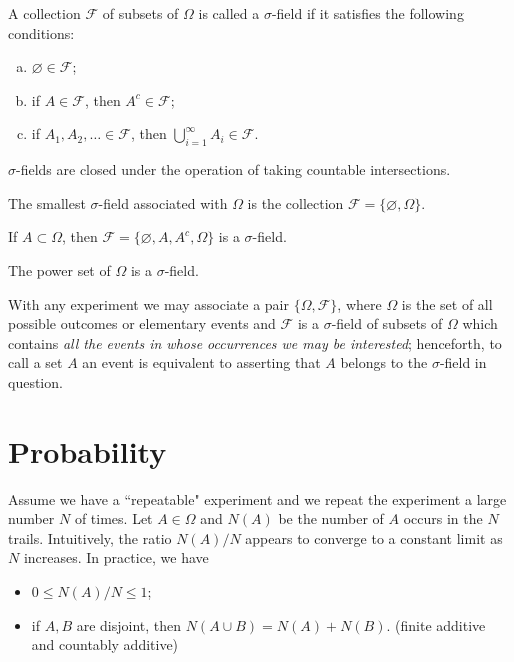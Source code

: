 \begin{definition}
A collection $\mathcal{F}$ of subsets of $\Omega$ is called a $\sigma$-field if it satisfies the following conditions: 
\begin{enumerate}[(a)]
    \item $\varnothing \in \mathcal{F}$;
    \item if $A \in \mathcal{F}$, then $A^c \in \mathcal{F}$;
    \item if $A_1, A_2, \dots \in \mathcal{F}$, then $\bigcup_{i=1}^\infty A_i \in \mathcal{F}$.
\end{enumerate}
\end{definition}

\begin{remark}
$\sigma$-fields are closed under the operation of taking countable intersections.
\end{remark}

\begin{example}
The smallest $\sigma$-field associated with $\Omega$ is the collection $\mathcal{F} = \{\varnothing, \Omega \}$.
\end{example}

\begin{example}
If $A \subset \Omega$, then $\mathcal{F} = \{\varnothing, A, A^c, \Omega \}$ is a $\sigma$-field. 
\end{example}

\begin{example}
The power set of $\Omega$ is a $\sigma$-field.
\end{example}

With any experiment we may associate a pair $\{\Omega, \mathcal{F}\}$, where $\Omega$ is the set of all possible outcomes or elementary events and $\mathcal{F}$ is a $\sigma$-field of subsets of $\Omega$ which contains \emph{all the events in whose occurrences we may be interested}; henceforth, to call a set $A$ an event is equivalent to asserting that $A$ belongs to the $\sigma$-field in question. 


\section{Probability}
Assume we have a ``repeatable" experiment and we repeat the experiment a large number $N$ of times. Let $A \in \Omega$ and $N(A)$ be the number of $A$ occurs in the $N$ trails. Intuitively, the ratio $N(A)/ N$ appears to converge to a constant limit as $N$ increases. In practice, we have 
\begin{itemize}
    \item $0 \leq N(A)/ N \leq 1$;
    \item if $A, B$ are disjoint, then $N(A \cup B) = N(A) + N(B)$. (finite additive and countably additive)
\end{itemize}

